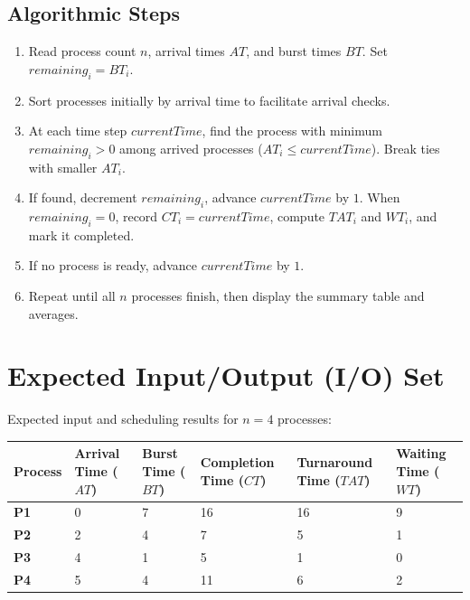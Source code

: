 \documentclass[10pt,a4paper]{article}
\begin{document}
\subsection{Algorithmic Steps}
\begin{enumerate}[noitemsep,topsep=1pt,leftmargin=1.4em]
  \item Read process count $n$, arrival times $AT$, and burst times $BT$. Set $remaining_i = BT_i$.
  \item Sort processes initially by arrival time to facilitate arrival checks.
  \item At each time step $currentTime$, find the process with minimum $remaining_i > 0$ among arrived processes ($AT_i \le currentTime$). Break ties with smaller $AT_i$.
  \item If found, decrement $remaining_i$, advance $currentTime$ by $1$. When $remaining_i = 0$, record $CT_i = currentTime$, compute $TAT_i$ and $WT_i$, and mark it completed.
  \item If no process is ready, advance $currentTime$ by $1$.
  \item Repeat until all $n$ processes finish, then display the summary table and averages.
\end{enumerate}

\section{Expected Input/Output (I/O) Set}
Expected input and scheduling results for $n = 4$ processes:

\vspace{-2pt}
\begin{table}[h!]
\centering\footnotesize
\renewcommand{\arraystretch}{1.08}
\begin{tabularx}{\linewidth}{YYYYYY}
\toprule
\textbf{Process} & \textbf{Arrival Time ($AT$)} & \textbf{Burst Time ($BT$)} & \textbf{Completion Time ($CT$)} & \textbf{Turnaround Time ($TAT$)} & \textbf{Waiting Time ($WT$)} \\
\midrule
\textbf{P1} & 0 & 7 & 16 & 16 & 9 \\
\textbf{P2} & 2 & 4 & 7  & 5  & 1 \\
\textbf{P3} & 4 & 1 & 5  & 1  & 0 \\
\textbf{P4} & 5 & 4 & 11 & 6  & 2 \\
\bottomrule
\end{tabularx}
\end{table}
\vspace{-6pt}
\end{document}
